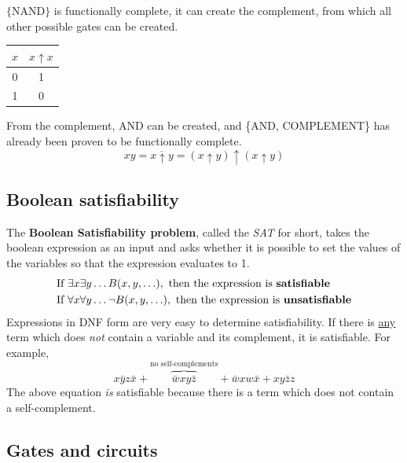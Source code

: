 $\{\text{NAND}\}$ is functionally complete, it can create the complement,
from which all other possible gates can be created.
\begin{center}
  \begin{tabular}{c|c}
    $x$ & $x \uparrow x$ \\
    \hline
    0   & 1              \\
    1   & 0
  \end{tabular}
\end{center}
From the complement, AND can be created, and \{AND, COMPLEMENT\} has already been proven to be functionally complete.
\[
  xy = \overline{x \uparrow y} = (x \uparrow y) \uparrow (x \uparrow y)
\]

\subsection{Boolean satisfiability}

The \textbf{Boolean Satisfiability problem}, called the \textit{SAT} for short,
takes the boolean expression as an input and asks whether it is possible to set the values of the variables
so that the expression evaluates to 1.
\begin{align*}
  \text{If } & \exists x \exists y \ldots B(x, y, \ldots), \text{ then the expression is \textbf{satisfiable}}         \\
  \text{If } & \forall x \forall y \ldots \lnot B(x, y, \ldots), \text{ then the expression is \textbf{unsatisfiable}} \\
\end{align*}
Expressions in DNF form are very easy to determine satisfiability.
If there is \underline{any} term which does \textit{not} contain a variable and its complement,
it is satisfiable. For example,
\[
  x\bar{y}z\bar{x} + \overbrace{\bar{w}xy\bar{z}}^\text{no self-complements} + \bar{w}xw\bar{x} + xy\bar{z}z
\]
The above equation \textit{is} satisfiable because there is a term which does not contain a self-complement.

\subsection{Gates and circuits}

